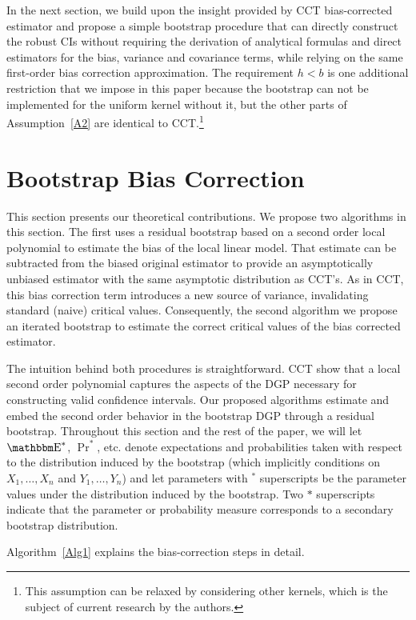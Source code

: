 \documentclass[12pt,fleqn]{article}
\begin{document}
In the next section, we build upon the insight provided by CCT bias-corrected
estimator and propose a simple bootstrap procedure that can directly construct
the robust CIs without requiring the derivation of analytical formulas and
direct estimators for the bias, variance and covariance terms, while relying on
the same first-order bias correction approximation. The requirement $h < b$ is
one additional restriction that we impose in this paper because the bootstrap
can not be implemented for the uniform kernel without it, but the other parts of
Assumption~\ref{A2} are identical to CCT.\footnote{%
  This assumption can be relaxed by considering other kernels, which is the
  subject of current research by the authors.} %

\section{Bootstrap Bias Correction}\label{boot}

This section presents our theoretical contributions. We propose two algorithms
in this section. The first uses a residual bootstrap based on a second
order local polynomial to estimate the bias of the local linear model. That
estimate can be subtracted from the biased original estimator to provide an
asymptotically unbiased estimator with the same asymptotic distribution as
CCT's. As in CCT, this bias correction term introduces a new source of variance,
invalidating standard (naive) critical values. Consequently, the second
algorithm we propose an iterated bootstrap to estimate the correct
critical values of the bias corrected estimator.

The intuition behind both procedures is straightforward. CCT show that a
local second order polynomial captures the aspects of the DGP
necessary for constructing valid confidence intervals. Our proposed algorithms
estimate and embed the second order behavior in the bootstrap DGP through a
residual bootstrap. Throughout this section and the rest of the paper, we will
let $\E^{*}$, $\Pr^{*}$, etc. denote expectations and probabilities taken with
respect to the distribution induced by the bootstrap (which implicitly
conditions on $X_{1},\dots,X_{n}$ and $Y_{1},\dots,Y_{n}$) and let parameters with
$^{*}$ superscripts be the parameter values under the distribution induced by
the bootstrap. Two $*$ superscripts indicate that the parameter or probability
measure corresponds to a secondary bootstrap distribution.

Algorithm~\ref{Alg1} explains the bias-correction steps in detail.
\end{document}
